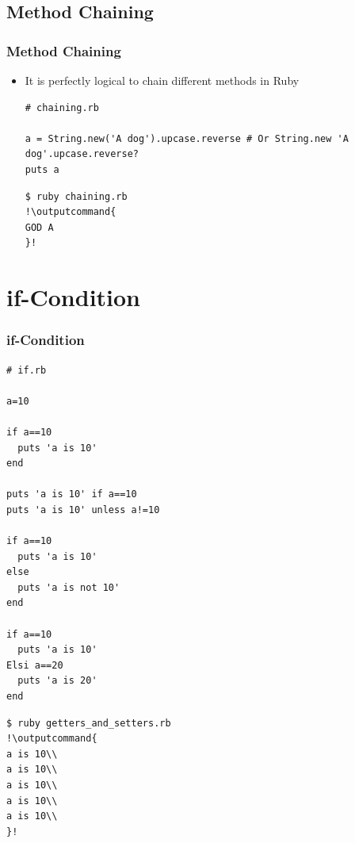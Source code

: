 \documentclass{beamer}
\newcommand{\outputcommand}[1]{\color{darkgreen}{#1}}
\begin{document}
\subsection{Method Chaining}
\begin{frame}[fragile]
\frametitle{Method Chaining}
\begin{itemize}
 \item It is perfectly logical to chain different methods in Ruby

\lstset{language=Ruby, style=eclipse}
\begin{lstlisting}[escapechar=&]
# chaining.rb

a = String.new('A dog').upcase.reverse # Or String.new 'A dog'.upcase.reverse?
puts a
\end{lstlisting}

\lstset{language=shell}
\begin{lstlisting}[numbers=none, escapechar=!]
$ ruby chaining.rb
!\outputcommand{
GOD A
}!
\end{lstlisting}
\end{itemize}

\end{frame}
\section{if-Condition}
\begin{frame}
\frametitle{if-Condition}
\lstset{language=Ruby, style=eclipse}
\begin{lstlisting}[escapechar=&]
# if.rb

a=10

if a==10
  puts 'a is 10'
end

puts 'a is 10' if a==10
puts 'a is 10' unless a!=10

if a==10
  puts 'a is 10'
else
  puts 'a is not 10'
end

if a==10
  puts 'a is 10'
Elsi a==20
  puts 'a is 20'
end
\end{lstlisting}

\lstset{language=shell}
\begin{lstlisting}[numbers=none, escapechar=!]
$ ruby getters_and_setters.rb
!\outputcommand{
a is 10\\
a is 10\\
a is 10\\
a is 10\\
a is 10\\
}!
\end{lstlisting}
\end{frame}
\end{document}
